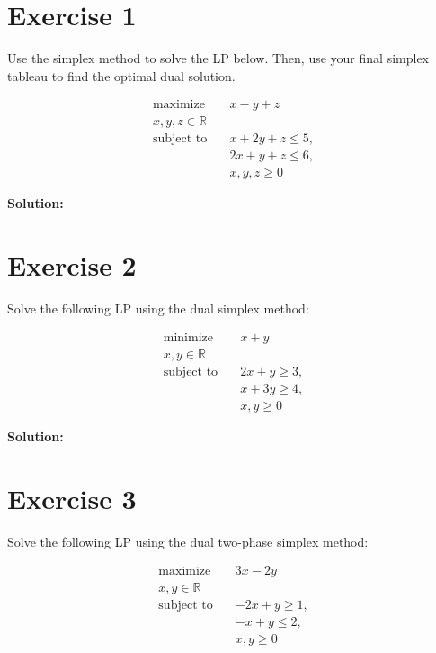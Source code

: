 \documentclass{article}
\begin{document}
\section*{Exercise 1}
Use the simplex method to solve the LP below. Then, use your final simplex tableau to find the optimal dual solution.

\begin{align*}
\text{maximize} \quad & x - y + z\\
x, y, z \in \mathbb{R} \quad & \\
\text{subject to} \quad & x + 2y + z \leq 5,\\
& 2x + y + z \leq 6,\\
& x, y, z \geq 0
\end{align*}

\textbf{Solution:} \\



\newpage

\section*{Exercise 2}
Solve the following LP using the dual simplex method:

\begin{align*}
\text{minimize} \quad & x + y\\
x, y \in \mathbb{R} \quad & \\
\text{subject to} \quad & 2x + y \geq 3,\\
& x + 3y \geq 4,\\
& x, y \geq 0
\end{align*}

\textbf{Solution:} \\



\newpage

\section*{Exercise 3}
Solve the following LP using the dual two-phase simplex method:

\begin{align*}
\text{maximize} \quad & 3x - 2y\\
x, y \in \mathbb{R} \quad & \\
\text{subject to} \quad & -2x + y \geq 1,\\
& -x + y \leq 2,\\
& x, y \geq 0
\end{align*}
\end{document}
